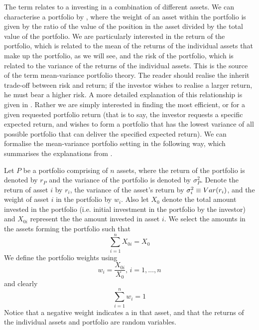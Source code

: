 The term  relates to a investing in a combination of different assets. We can characterise a portfolio by , where the weight of an asset within the portfolio is given by the ratio of the value of the position in the asset divided by the total value of the portfolio.
We are particularly interested in the return of the portfolio, which is related to the mean of the returns of the individual assets that make up the portfolio, as we will see, and the risk of the portfolio, which is related to the variance of the returns of the individual assets. This is the source of the term mean-variance portfolio theory.
The reader should realise the inherit trade-off between risk and return; if the investor wishes to realise a larger return, he must bear a higher risk. A more detailed explanation of this relationship is given in \cite{Lue98,Kuh12e}.
Rather we are simply interested in finding the most efficient, or  for a given requested portfolio return (that is to say, the investor requests a specific expected return, and wishes to form a portfolio that has the lowest variance of all possible portfolio that can deliver the specified expected return).
We can formalise the mean-variance portfolio setting in the following way, which summarises the explanations from \cite{Onn02,Lue98,Kuh12e}.

Let $P$ be a portfolio comprising of $n$ assets, where the return of the portfolio is denoted by $r_{P}$ and the variance of the portfolio is denoted by $\sigma^{2}_{P}$.
Denote the return of asset $i$ by $r_{i}$, the variance of the asset's return by $\sigma^{2}_{i} \equiv Var(r_{i})$, and the weight of asset $i$ in the portfolio by $w_{i}$.
Also let $X_{0}$ denote the total amount invested in the portfolio (i.e. initial investment in the portfolio by the investor) and $X_{0i}$ represent the the amount invested in asset $i$.
We select the amounts in the assets forming the portfolio such that
\begin{equation}
	\label{eq:portfolioAmounts}
	\sum_{i=1}^{n} X_{0i} = X_{0}
\end{equation}
We define the portfolio weights using
\begin{equation}
	\label{eq:portfolioWeights}
	w_{i} = \frac{X_{0i}}{X_{0}} \text{, } i = 1,\dots,n
\end{equation}
and clearly
\begin{equation}
	\label{eq:portfolioWeightsSum}
	\sum_{i=1}^{n} w_{i} = 1
\end{equation}
Notice that a negative weight indicates a  in that asset, and that the returns of the individual assets and portfolio are random variables.

